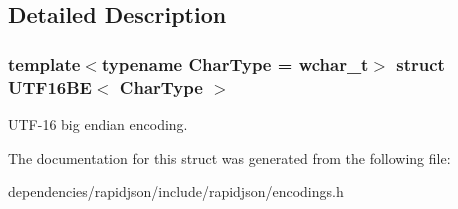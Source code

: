 \subsection{Detailed Description}
\subsubsection*{template$<$typename Char\+Type = wchar\+\_\+t$>$\newline
struct U\+T\+F16\+B\+E$<$ Char\+Type $>$}

U\+T\+F-\/16 big endian encoding. 

The documentation for this struct was generated from the following file\+:\begin{DoxyCompactItemize}
\item 
dependencies/rapidjson/include/rapidjson/encodings.\+h\end{DoxyCompactItemize}
